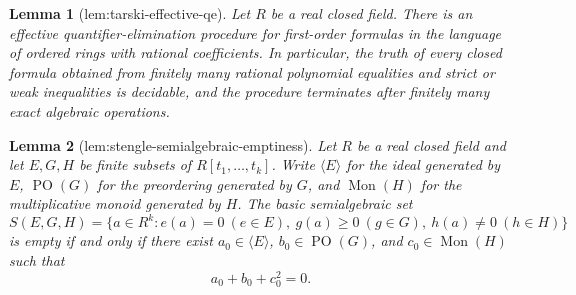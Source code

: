 \documentclass{article}
\newtheorem{lemma}{Lemma}
\begin{document}
\begin{lemma}[lem:tarski-effective-qe]\label{lem:tarski-effective-qe}
Let \(R\) be a real closed field.  There is an effective quantifier-elimination procedure for first-order formulas in the language of ordered rings with rational coefficients.  In particular, the truth of every closed formula obtained from finitely many rational polynomial equalities and strict or weak inequalities is decidable, and the procedure terminates after finitely many exact algebraic operations.
\end{lemma}

\begin{lemma}[lem:stengle-semialgebraic-emptiness]\label{lem:stengle-semialgebraic-emptiness}
Let \(R\) be a real closed field and let \(E,G,H\) be finite subsets of \(R[t_1,\ldots,t_k]\).  Write \(\langle E\rangle\) for the ideal generated by \(E\), \(\operatorname{PO}(G)\) for the preordering generated by \(G\), and \(\operatorname{Mon}(H)\) for the multiplicative monoid generated by \(H\).  The basic semialgebraic set
\[
 S(E,G,H)=\{a\in R^k:e(a)=0\ (e\in E),\ g(a)\geq0\ (g\in G),\ h(a)\neq0\ (h\in H)\}
\]
is empty if and only if there exist \(a_0\in\langle E\rangle\), \(b_0\in\operatorname{PO}(G)\), and \(c_0\in\operatorname{Mon}(H)\) such that
\[
 a_0+b_0+c_0^2=0.
\]
\end{lemma}
\end{document}
